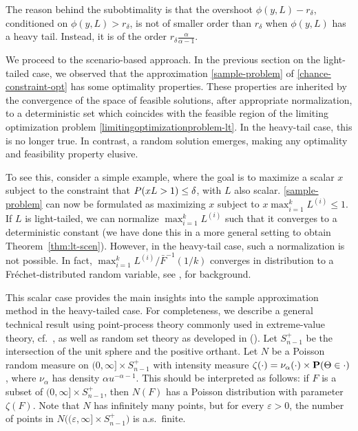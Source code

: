 \documentclass[a4paper, a4wide, 10pt, reqno]{amsart}
\theoremstyle{plain}
\begin{document}
The reason behind the subobtimality is that the overshoot $\phi (y,L)-r_\delta$, conditioned on  $\phi (y,L)>r_\delta$, is not of smaller order than $r_\delta$ when $\phi (y,L)$ has a heavy tail. Instead, it is of the order $r_\delta \frac{\alpha}{\alpha-1}$. 

\smallskip
We proceed to the scenario-based approach. In the previous section on the light-tailed case, we observed that the approximation \eqref{sample-problem} of \eqref{chance-constraint-opt} has some optimality properties. These properties are inherited by the convergence of the space of feasible solutions, after appropriate normalization, to a deterministic set which coincides with the feasible region of the limiting optimization problem \eqref{limitingoptimizationproblem-lt}. In the heavy-tail case, this is no longer true. In contrast, a random solution emerges, making any optimality and feasibility property elusive. 

\smallskip
To see this, consider a simple example, where the goal is to maximize a scalar $x$ subject to the constraint that ${\bf} P(xL> 1) \leq \delta$, with $L$ also scalar. 
\eqref{sample-problem} can now be formulated as maximizing $x$ subject to 
$x\max_{i=1}^k L^{(i)} \leq 1$. 
If $L$ is light-tailed, 
we can normalize $\max_{i=1}^k L^{(i)}$ such that it converges to a deterministic constant (we have done this in a more general setting to obtain Theorem~\ref{thm:lt-scen}). However, in the heavy-tail case, such a normalization is not possible. In fact, 
$\max_{i=1}^k L^{(i)}/\bar F ^{-1}(1/k)$  converges in distribution to a Fr\'echet-distributed random variable, see \cite{Resnick07}, \cite{NWZ22} for background. 

\smallskip
This scalar case provides the main insights into the sample approximation method in the heavy-tailed case. For completeness, we
 describe a general technical result 
using point-process theory commonly used in extreme-value theory, cf.\ \cite{Resnick07}, as well as random set theory as developed in (\cite{Molchanov16}).
Let  $S_{n-1}^+$ be the intersection of the unit sphere and the positive orthant. 
Let $N$ be a Poisson random measure on 
$(0,\infty] \times S_{n-1}^+$ with intensity measure $\zeta(\cdot) = \nu_\alpha (\cdot) \times {\bf P}(\Theta \in \cdot)$, where $\nu_\alpha$
has density $\alpha u^{-\alpha-1}$.
This should be interpreted as follows: if $F$ is a subset of $(0,\infty] \times S_{n-1}^+$, then $N(F)$ has a Poisson distribution with parameter 
$\zeta(F)$. 
Note that $N$ has infinitely many points, but for every $\varepsilon>0$,  the number of points in $N\big((\varepsilon, \infty] \times S_{n-1}^+\big)$ is a.s.\ finite.  
\end{document}
